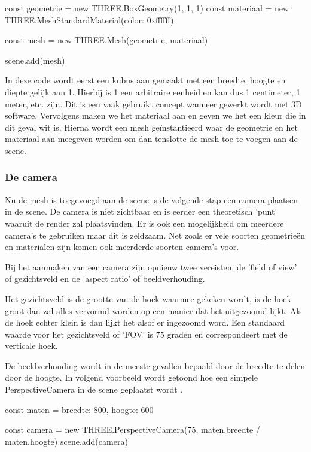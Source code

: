 \begin{LVerbatim}
const geometrie = new THREE.BoxGeometry(1, 1, 1)
const materiaal = new THREE.MeshStandardMaterial({color: 0xffffff})

const mesh = new THREE.Mesh(geometrie, materiaal)

scene.add(mesh)
\end{LVerbatim}

In deze code wordt eerst een kubus aan gemaakt met een breedte, hoogte en diepte gelijk aan 1. Hierbij is 1 een arbitraire eenheid en kan dus 1 centimeter, 1 meter, etc. zijn. Dit is een vaak gebruikt concept wanneer gewerkt wordt met 3D software. Vervolgens maken we het materiaal aan en geven we het een kleur die in dit geval wit is. Hierna wordt een mesh geïnstantieerd waar de geometrie en het materiaal aan meegeven worden om dan tenslotte de mesh toe te voegen aan de scene.

\subsubsection{De camera}

Nu de mesh is toegevoegd aan de scene is de volgende stap een camera plaatsen in de scene. De camera is niet zichtbaar en is eerder een theoretisch 'punt' waaruit de render zal plaatsvinden. Er is ook een mogelijkheid om meerdere camera's te gebruiken maar dit is zeldzaam. Net zoals er vele soorten geometrieën en materialen zijn komen ook meerderde soorten camera's voor.

Bij het aanmaken van een camera zijn opnieuw twee vereisten: de 'field of view' of gezichtsveld en de 'aspect ratio' of beeldverhouding. 

Het gezichtsveld is de grootte van de hoek waarmee gekeken wordt, is de hoek groot dan zal alles vervormd worden op een manier dat het uitgezoomd lijkt. Als de hoek echter klein is dan lijkt het alsof er ingezoomd word. Een standaard waarde voor het gezichtsveld of 'FOV' is 75 graden en correspondeert met de verticale hoek.

De beeldverhouding wordt in de meeste gevallen bepaald door de breedte te delen door de hoogte. In volgend voorbeeld wordt getoond hoe een simpele PerspectiveCamera in de scene geplaatst wordt \autocite{Simon2023}.

\begin{LVerbatim}
const maten = {
	breedte: 800,
	hoogte: 600
}

const camera = new THREE.PerspectiveCamera(75, maten.breedte / maten.hoogte)
scene.add(camera)
\end{LVerbatim}

